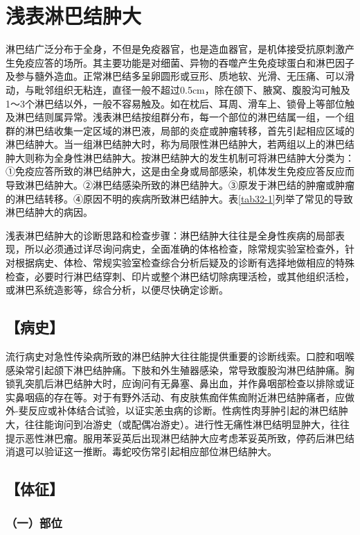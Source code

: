 \chapter{浅表淋巴结肿大}

淋巴结广泛分布于全身，不但是免疫器官，也是造血器官，是机体接受抗原刺激产生免疫应答的场所。其主要功能是对细菌、异物的吞噬产生免疫球蛋白和淋巴因子及参与髓外造血。正常淋巴结多呈卵圆形或豆形、质地软、光滑、无压痛、可以滑动，与毗邻组织无粘连，直径一般不超过0.5cm，除在颌下、腋窝、腹股沟可触及1～3个淋巴结以外，一般不容易触及。如在枕后、耳周、滑车上、锁骨上等部位触及淋巴结则属异常。浅表淋巴结按组群分布，每一个部位的淋巴结属一组，一个组群的淋巴结收集一定区域的淋巴液，局部的炎症或肿瘤转移，首先引起相应区域的淋巴结肿大。当一组淋巴结肿大时，称为局限性淋巴结肿大，若两组以上的淋巴结肿大则称为全身性淋巴结肿大。按淋巴结肿大的发生机制可将淋巴结肿大分类为：①免疫应答所致的淋巴结肿大，这是由全身或局部感染，机体发生免疫应答反应而导致淋巴结肿大。②淋巴结感染所致的淋巴结肿大。③原发于淋巴结的肿瘤或肿瘤的淋巴结转移。④原因不明的疾病所致淋巴结肿大。表\ref{tab32-1}列举了常见的导致淋巴结肿大的病因。

浅表淋巴结肿大的诊断思路和检查步骤：淋巴结肿大往往是全身性疾病的局部表现，所以必须通过详尽询问病史，全面准确的体格检查，除常规实验室检查外，针对根据病史、体检、常规实验室检查综合分析后疑及的诊断有选择地做相应的特殊检查，必要时行淋巴结穿刺、印片或整个淋巴结切除病理活检，或其他组织活检，或淋巴系统造影等，综合分析，以便尽快确定诊断。

\section{【病史】}

流行病史对急性传染病所致的淋巴结肿大往往能提供重要的诊断线索。口腔和咽喉感染常引起颌下淋巴结肿痛。下肢和外生殖器感染，常导致腹股沟淋巴结肿痛。胸锁乳突肌后淋巴结肿大时，应询问有无鼻塞、鼻出血，并作鼻咽部检查以排除或证实鼻咽癌的存在等。对于有野外活动、有皮肤焦痂伴焦痂附近淋巴结肿痛者，应做外-斐反应或补体结合试验，以证实恙虫病的诊断。性病性肉芽肿引起的淋巴结肿大，往往能询问到冶游史（或配偶冶游史）。进行性无痛性淋巴结明显肿大，往往提示恶性淋巴瘤。服用苯妥英后出现淋巴结肿大应考虑苯妥英所致，停药后淋巴结消退可以验证这一推断。毒蛇咬伤常引起相应部位淋巴结肿大。

\section{【体征】}

\subsection{（一）部位}

